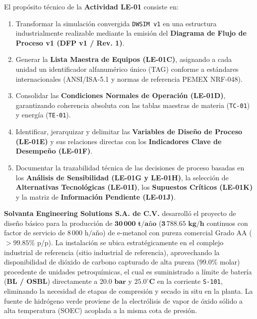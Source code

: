 \documentclass[10pt,letterpaper]{article}
\begin{document}
\begin{propositobox}
El propósito técnico de la \textbf{Actividad LE-01} consiste en:
\begin{enumerate}[leftmargin=*]
    \item Transformar la simulación convergida \texttt{DWSIM v1} en una estructura industrialmente realizable mediante la emisión del \textbf{Diagrama de Flujo de Proceso v1 (DFP v1 / Rev. 1)}.
    \item Generar la \textbf{Lista Maestra de Equipos (LE-01C)}, asignando a cada unidad un identificador alfanumérico único (TAG) conforme a estándares internacionales (ANSI/ISA-5.1 y normas de referencia PEMEX NRF-048).
    \item Consolidar las \textbf{Condiciones Normales de Operación (LE-01D)}, garantizando coherencia absoluta con las tablas maestras de materia (\texttt{TC-01}) y energía (\texttt{TE-01}).
    \item Identificar, jerarquizar y delimitar las \textbf{Variables de Diseño de Proceso (LE-01E)} y sus relaciones directas con los \textbf{Indicadores Clave de Desempeño (LE-01F)}.
    \item Documentar la trazabilidad técnica de las decisiones de proceso basadas en los \textbf{Análisis de Sensibilidad (LE-01G y LE-01H)}, la selección de \textbf{Alternativas Tecnológicas (LE-01I)}, los \textbf{Supuestos Críticos (LE-01K)} y la matriz de \textbf{Información Pendiente (LE-01J)}.
\end{enumerate}
\end{propositobox}

\textbf{Solvanta Engineering Solutions S.A. de C.V.} desarrolló el proyecto de diseño básico para la producción de $\mathbf{30\,000\text{ t/año}}$ ($\mathbf{3\,788.65\text{ kg/h}}$ continuos con factor de servicio de $8\,000\text{ h/año}$) de e-metanol con pureza comercial Grado AA ($>99.85\%$ p/p). La instalación se ubica estratégicamente en el complejo industrial de referencia (sitio industrial de referencia), aprovechando la disponibilidad de dióxido de carbono capturado de alta pureza ($99.0\%$ molar) procedente de unidades petroquímicas, el cual es suministrado a límite de batería (\textbf{BL / OSBL}) directamente a $\mathbf{20.0\text{ bar}}$ y $\mathbf{25.0^\circ\text{C}}$ en la corriente \texttt{S-101}, eliminando la necesidad de etapas de compresión y secado in situ en la planta. La fuente de hidrógeno verde proviene de la electrólisis de vapor de óxido sólido a alta temperatura (SOEC) acoplada a la misma cota de presión.
\end{document}
